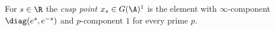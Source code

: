 For $s\in\R$ the \emph{cusp point} $x_s\in G(\A)^1$ is the element with $\infty$-component $\diag(e^s,e^{-s})$ and $p$-component $1$ for every prime $p$.
